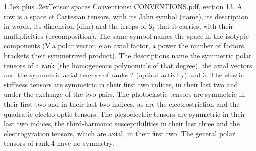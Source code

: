 \documentclass[10pt,a4paper]{article}
\makeatletter
\renewcommand\section{\@startsection{section}{1}{\z@}{-3ex plus -1ex minus -.2ex}%
  {1.2ex plus .2ex}{\normalfont\large\sffamily\bfseries\color{parttitle}}}
\numberwithin{equation}{section}
\newcommand{\grp}[1]{\mathsf{#1}}
\makeatother
\begin{document}
\section{Tensor spaces}\label{s:tensor_spaces}
Conventions: \href{../../CONVENTIONS.pdf}{CONVENTIONS.pdf}, section \href{../../CONVENTIONS.pdf\#conv.13}{13}.
\leavevmode\label{n:head.name}\label{n:head.description}\label{n:head.dim}\label{n:head.decomposition}A row is a space of Cartesian tensors, with its Jahn symbol (name), its description in words, its dimension (dim) and the irreps of $\grp{S_{6}}$ that it carries, with their multiplicities (decomposition). \label{n:label.jahn}The same symbol names the space in the isotypic components (V a polar vector, e an axial factor, a power the number of factors, brackets their symmetrized product). The descriptions name the symmetric polar tensors of a rank (the homogeneous polynomials of that degree), the axial vectors and the symmetric axial tensors of ranks 2 (optical activity) and 3. The elastic stiffness tensors are symmetric in their first two indices, in their last two and under the exchange of the two pairs. The photoelastic tensors are symmetric in their first two and in their last two indices, as are the electrostriction and the quadratic electro-optic tensors. The piezoelectric tensors are symmetric in their last two indices, the third-harmonic susceptibilities in their last three and the electrogyration tensors, which are axial, in their first two. The general polar tensors of rank 4 have no symmetry.
\end{document}
